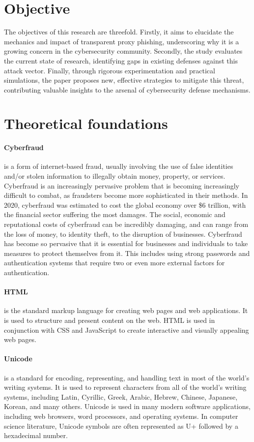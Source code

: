 \documentclass[12pt]{scrbook}
\begin{document}
\section{Objective}
The objectives of this research are threefold. Firstly, it aims to elucidate the
mechanics and impact of transparent proxy phishing, underscoring why it is a
growing concern in the cybersecurity community. Secondly, the study evaluates
the current state of research, identifying gaps in existing defenses against
this attack vector. Finally, through rigorous experimentation and practical
simulations, the paper proposes new, effective strategies to mitigate this
threat, contributing valuable insights to the arsenal of cybersecurity defense
mechanisms.

\newpage \section{Theoretical foundations}
\paragraph{Cyberfraud} is a form of internet-based fraud, usually involving the
use of false identities and/or stolen information to illegally obtain money,
property, or services.
Cyberfraud is an increasingly pervasive problem that is becoming increasingly
difficult to combat, as fraudsters become more sophisticated in their methods.
In 2020, cyberfraud was estimated to cost the global economy over \$6
trillion\cite{6trillion}, with the financial sector suffering the most damages.
The social, economic and reputational costs of cyberfraud can be incredibly
damaging, and can range from the loss of money, to identity theft, to the
disruption of businesses. Cyberfraud has become so pervasive that it is
essential for businesses and individuals to take measures to protect themselves
from it. This includes using strong passwords and authentication systems that
require
two or even more external factors for authentication.

\paragraph{HTML} is the standard markup language for creating web pages
and web applications. It is used to structure and present content on the web.
HTML is used in conjunction with CSS and JavaScript to create interactive and
visually appealing web pages.

\paragraph{Unicode} is a standard for encoding,
representing, and handling text in most of the world's writing systems. It is
used to represent characters from all of the world's writing systems, including
Latin, Cyrillic, Greek, Arabic, Hebrew, Chinese, Japanese, Korean, and many
others. Unicode is used in many modern software applications, including web
browsers, word processors, and operating systems. In computer science
literature, Unicode symbols are often represented as U+ followed by a
hexadecimal number.
\end{document}
